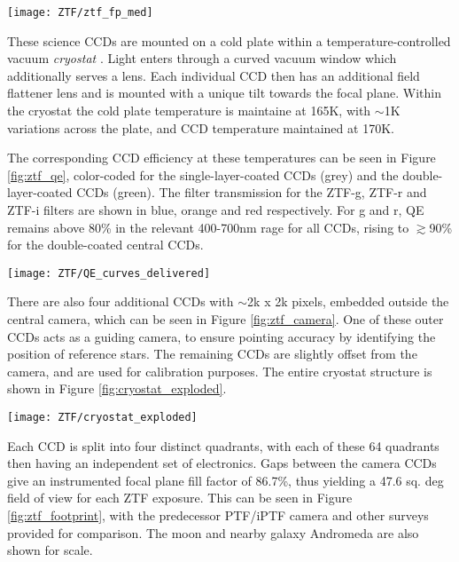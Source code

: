 \begin{marginfigure}
	\centering \texttt{[image: ZTF/ztf\_fp\_med]}
	\caption{An image of the ZTF camera, from \cite{ztf_system}.}
	\label{fig:ztf_camera}
\end{marginfigure}

These science CCDs are mounted on a cold plate within a temperature-controlled vacuum \emph{cryostat} \cite{ztf_obs_system}. Light enters through a curved vacuum window which additionally serves a lens. Each individual CCD then has an additional field flattener lens and is mounted with a unique tilt towards the focal plane. Within the cryostat the cold plate temperature is maintaine at 165K, with $\sim$1K variations across the plate, and CCD temperature maintained at 170K. 

The corresponding CCD efficiency at these temperatures can be seen in Figure \ref{fig:ztf_qe}, color-coded for the single-layer-coated CCDs (grey) and the double-layer-coated CCDs (green). The filter transmission for the ZTF-g, ZTF-r and ZTF-i filters are shown in blue, orange and red respectively. For g and r, QE remains above 80\% in the relevant 400-700nm rage for all CCDs, rising to $\gtrsim$90\% for the double-coated central CCDs. 

\begin{marginfigure}
	\centering \texttt{[image: ZTF/QE\_curves\_delivered]}
	\caption{The quantum efficiency of ZTF CCDs, from \cite{ztf_system}.}
	\label{fig:ztf_qe}
\end{marginfigure}

There are also four additional CCDs with $\sim$2k x 2k pixels, embedded outside the central camera, which can be seen in Figure \ref{fig:ztf_camera}. One of these outer CCDs acts as a guiding camera, to ensure pointing accuracy by identifying the position of reference stars. The remaining CCDs are slightly offset from the camera, and are used for calibration purposes. The entire cryostat structure is shown in Figure \ref{fig:cryostat_exploded}.

\begin{figure*}
	\centering \texttt{[image: ZTF/cryostat\_exploded]}
	\caption{The ZTF cryostat design, from \cite{ztf_system}.}
	\label{fig:cryostat_exploded}
\end{figure*}

Each CCD is split into four distinct quadrants, with each of these 64 quadrants then having an independent set of electronics. Gaps between the camera CCDs give an instrumented focal plane fill factor of 86.7\%, thus yielding a 47.6 sq. deg field of view for each ZTF exposure. This can be seen in Figure \ref{fig:ztf_footprint}, with the predecessor PTF/iPTF camera and other surveys provided for comparison. The moon and nearby galaxy Andromeda are also shown for scale.

